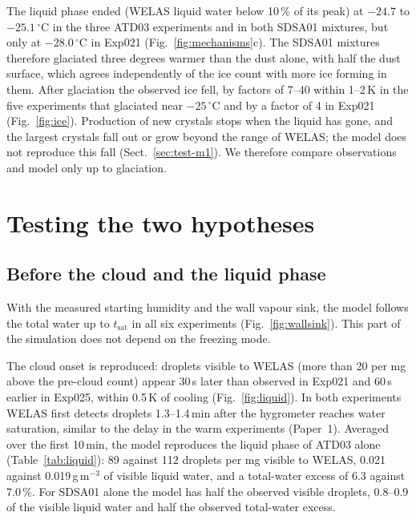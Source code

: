 The liquid phase ended (WELAS liquid water below 10\,\% of its peak) at $-24.7$ to $-25.1\,^\circ$C in the three ATD03 experiments and in both SDSA01 mixtures, but only at $-28.0\,^\circ$C in Exp021 (Fig.~\ref{fig:mechanisms}c). The SDSA01 mixtures therefore glaciated three degrees warmer than the dust alone, with half the dust surface, which agrees independently of the ice count with more ice forming in them. After glaciation the observed ice fell, by factors of 7--40 within 1--2\,K in the five experiments that glaciated near $-25\,^\circ$C and by a factor of 4 in Exp021 (Fig.~\ref{fig:ice}). Production of new crystals stops when the liquid has gone, and the largest crystals fall out or grow beyond the range of WELAS; the model does not reproduce this fall (Sect.~\ref{sec:test-m1}). We therefore compare observations and model only up to glaciation. 

\section{Testing the two hypotheses}\label{sec:test}

\subsection{Before the cloud and the liquid phase}\label{sec:test-liquid}

With the measured starting humidity and the wall vapour sink, the model follows the total water up to $t_\mathrm{sat}$ in all six experiments (Fig.~\ref{fig:wallsink}). This part of the simulation does not depend on the freezing mode.

The cloud onset is reproduced: droplets visible to WELAS (more than 20 per mg above the pre-cloud count) appear 30\,s later than observed in Exp021 and 60\,s earlier in Exp025, within 0.5\,K of cooling (Fig.~\ref{fig:liquid}). In both experiments WELAS first detects droplets 1.3--1.4\,min after the hygrometer reaches water saturation, similar to the delay in the warm experiments (Paper~1). Averaged over the first 10\,min, the model reproduces the liquid phase of ATD03 alone (Table~\ref{tab:liquid}): 89 against 112 droplets per mg visible to WELAS, 0.021 against 0.019\,g\,m$^{-3}$ of visible liquid water, and a total-water excess of 6.3 against 7.0\,\%. For SDSA01 alone the model has half the observed visible droplets, 0.8--0.9 of the visible liquid water and half the observed total-water excess.


